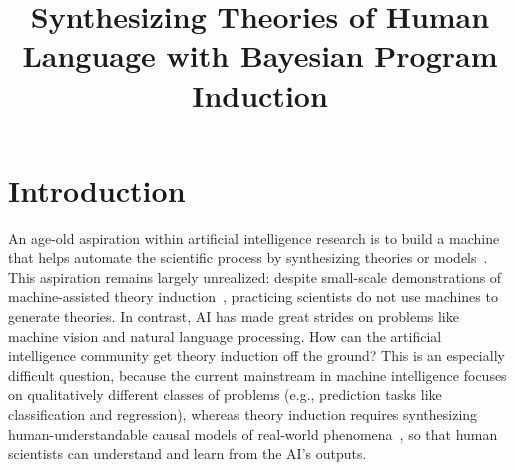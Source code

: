 \documentclass[12pt]{article}
\title{Synthesizing Theories of Human Language with Bayesian Program Induction}
\date{}
\newenvironment{sciabstract}{%
\begin{quote} \bf}
{\end{quote}}
\begin{document}
 


\baselineskip24pt


\maketitle 




\begin{sciabstract}
\end{sciabstract}




\section*{Introduction}

An age-old aspiration within artificial intelligence research is to
build a machine that helps automate the scientific process by
synthesizing theories or
models~\cite{paul1990autonomous,langley1987scientific,schmidt2009distilling}.
This aspiration remains largely unrealized: despite small-scale
demonstrations of machine-assisted theory
induction~\cite{Langley1981BACON5TD,schmidt2009distilling}, practicing
scientists do not use machines to generate theories.  In contrast, AI
has made great strides on problems like machine vision and natural
language processing.  How can the artificial intelligence community
get theory induction off the ground?  This is an especially difficult
question, because the current mainstream in machine intelligence
focuses on qualitatively different classes of problems (e.g.,
prediction tasks like classification and regression), whereas theory
induction requires synthesizing human-understandable causal models of
real-world phenomena~\cite{pearl2009causality}, so that human
scientists can understand and learn from the AI's outputs.
\end{document}
